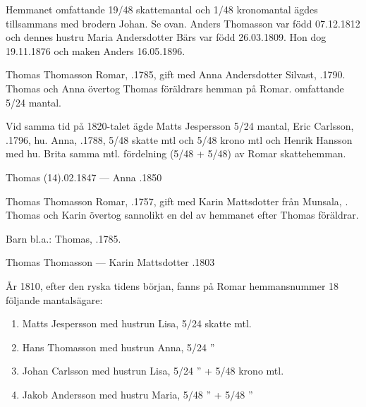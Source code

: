 Hemmanet omfattande 19/48 skattemantal och 1/48 kronomantal ägdes tillsammans med brodern Johan. Se ovan. Anders Thomasson var född 07.12.1812 och dennes hustru Maria Andersdotter Bärs var född 26.03.1809. Hon dog 19.11.1876 och maken Anders 16.05.1896.
\begin{jhchildren}
  \item {}
  \item {}
\end{jhchildren}


Thomas Thomasson Romar, .1785, gift med Anna Andersdotter Silvast, .1790. Thomas och Anna övertog Thomas föräldrars hemman på Romar. omfattande 5/24 mantal.

Vid samma tid på 1820-talet ägde Matts Jespersson 5/24 mantal, Eric Carlsson, .1796, hu. Anna, .1788,  5/48 skatte mtl och 5/48 krono mtl och Henrik Hansson med hu. Brita samma mtl. fördelning (5/48 + 5/48) av Romar skattehemman.
\begin{jhchildren}
  \item {}
  \item {}
  \item {}
  \item {}
\end{jhchildren}

Thomas (14).02.1847  ---  Anna .1850


Thomas Thomasson Romar, .1757, gift med Karin Mattsdotter från Munsala, . Thomas och Karin övertog sannolikt en del av hemmanet efter Thomas föräldrar.

Barn bl.a.: Thomas, .1785.

Thomas Thomasson   ---  Karin Mattsdotter .1803


År 1810, efter den ryska tidens början, fanns på Romar hemmansnummer 18 följande mantalsägare:
\begin{enumerate}
  \item Matts Jespersson med hustrun Lisa, 5/24 skatte mtl.
  \item Hans Thomasson med hustrun Anna,   5/24      ”
  \item Johan Carlsson med hustrun Lisa,   5/24      ”       + 5/48 krono mtl.
  \item Jakob Andersson med hustru Maria,  5/48      ”       + 5/48     ”
\end{enumerate}

